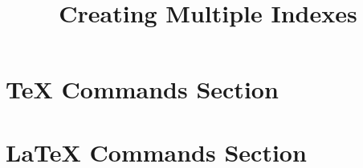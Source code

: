 \documentclass{article}
\title{\Large\bf Creating Multiple Indexes}
\date{}
\begin{document}
	\maketitle
	
	\section{TeX Commands Section}
	\kant[1] 
	
	\pagebreak
	
	\section{LaTeX Commands Section}
	\kant[1] 
	
	\printindex[tex]
	\printindex[latex]
	
\end{document}
